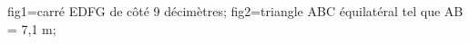 \documentclass[exercice]{thedocument}%
\begin{document}
%
    \>fig1=carré EDFG de côté 9 décimètres;%
    \>fig2=triangle ABC équilatéral tel que AB = 7,1 m;%
\end{document}

